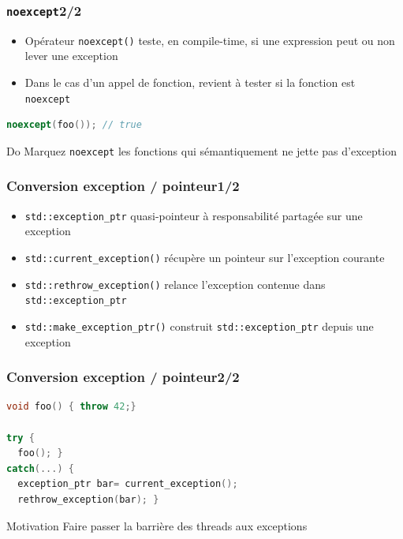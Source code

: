 \documentclass[C++.tex]{subfiles}
\begin{document}
\begin{frame}[fragile]
	\frametitle{\lstinline|noexcept|\titlehfill{}2/2}
	\begin{itemize}
		\item Opérateur \lstinline|noexcept()| teste, en compile-time, si une expression peut ou non lever une exception
		\item Dans le cas d'un appel de fonction, revient à tester si la fonction est \lstinline|noexcept|

	\end{itemize}

	\begin{lstlisting}[language=C++]
noexcept(foo()); // true\end{lstlisting}

	\begin{exampleblock}{Do}
		Marquez \lstinline|noexcept| les fonctions qui sémantiquement ne jette pas d'exception

	\end{exampleblock}
\end{frame}

\begin{frame}[fragile]
	\frametitle{\og{}Conversion\fg{} exception / pointeur\titlehfill{}1/2}
	\begin{itemize}
		\item \lstinline|std::exception_ptr| quasi-pointeur à responsabilité partagée sur une exception
		\item \lstinline|std::current_exception()| récupère un pointeur sur l'exception courante
		\item \lstinline|std::rethrow_exception()| relance l'exception contenue dans \lstinline|std::exception_ptr| 
		\item \lstinline|std::make_exception_ptr()| construit \lstinline|std::exception_ptr| depuis une exception
	\end{itemize}
\end{frame}

\begin{frame}[fragile]
	\frametitle{\og{}Conversion\fg{} exception / pointeur\titlehfill{}2/2}
	\begin{lstlisting}[language=C++]
void foo() { throw 42;}

try {
  foo(); }
catch(...) {
  exception_ptr bar= current_exception();
  rethrow_exception(bar); } \end{lstlisting}

	\begin{block}{Motivation}
		Faire passer la barrière des threads aux exceptions
	\end{block}
\end{frame}
\end{document}
